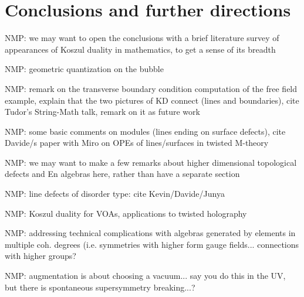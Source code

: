 \documentclass[11pt]{amsart}
\def\natalie#1{{\textcolor{green!65!black}{NMP: {#1}}}}
\begin{document}

\section{Conclusions and further directions}\label{s:conclusions}

\natalie{we may want to open the conclusions with a brief literature survey of appearances of Koszul duality in mathematics, to get a sense of its breadth}

\natalie{geometric quantization on the bubble}

\natalie{remark on the transverse boundary condition computation of the free field example, explain that the two pictures of KD connect (lines and boundaries), cite Tudor's String-Math talk, remark on it as future work}

\natalie{some basic comments on modules (lines ending on surface defects), cite Davide/s paper with Miro on OPEs of lines/surfaces in twisted M-theory}

\natalie{we may want to make a few remarks about higher dimensional topological defects and En algebras here, rather than have a separate section}

\natalie{line defects of disorder type: cite Kevin/Davide/Junya}

\natalie{Koszul duality for VOAs, applications to twisted holography}

\natalie{addressing technical complications with algebras generated by elements in multiple coh. degrees (i.e. symmetries with higher form gauge fields... connections with higher groups?}

\natalie{augmentation is about choosing a vacuum... say you do this in the UV, but there is spontaneous supersymmetry breaking...?}



\printbibliography
\end{document}
